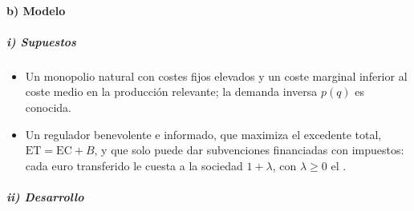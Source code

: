 \documentclass[11pt]{article}
\begin{document}
\paragraph{b) Modelo}

\subparagraph{i) Supuestos}

\begin{itemize}
\item Un monopolio natural con costes fijos elevados y un coste marginal inferior al coste medio en la producción relevante; la demanda inversa $p(q)$ es conocida.
\item Un regulador benevolente e informado, que maximiza el excedente total, $\mathrm{ET}=\mathrm{EC}+B$, y que solo puede dar subvenciones financiadas con impuestos: cada euro transferido le cuesta a la sociedad $1+\lambda$, con $\lambda\geq 0$ el .
\end{itemize}

\subparagraph{ii) Desarrollo}
\end{document}

